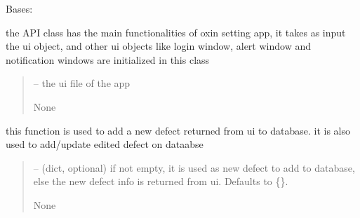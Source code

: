 \documentclass[letterpaper,10pt,english]{sphinxmanual}
\begin{document}
\begin{savenotes}\begin{fulllineitems}
\label{\detokenize{setting/setting_api:oxin.setting_api.API}}
\pysigstartsignatures
{}
\pysigstopsignatures
\sphinxAtStartPar
Bases: 

\sphinxAtStartPar
the API class has the main functionalities of oxin setting app, it takes as input the ui object, and other ui objects like login window,
alert window and notification windows are initialized in this class
\begin{quote}\begin{description}
\sphinxAtStartPar
{} – the ui file of the app

\sphinxAtStartPar
None

\end{description}\end{quote}

\begin{savenotes}\begin{fulllineitems}
\label{\detokenize{setting/setting_api:oxin.setting_api.API.add_defect}}
\pysigstartsignatures
{}
\pysigstopsignatures
\sphinxAtStartPar
this function is used to add a new defect returned from ui to database.
it is also used to add/update edited defect on dataabse
\begin{quote}\begin{description}
\sphinxAtStartPar
{} – (dict, optional) if not empty, it is used as new defect to add to database,
else the new defect info is returned from ui. Defaults to \{\}.

\sphinxAtStartPar
None

\end{description}\end{quote}

\end{fulllineitems}\end{savenotes}


\end{fulllineitems}
\end{savenotes}
\end{document}
